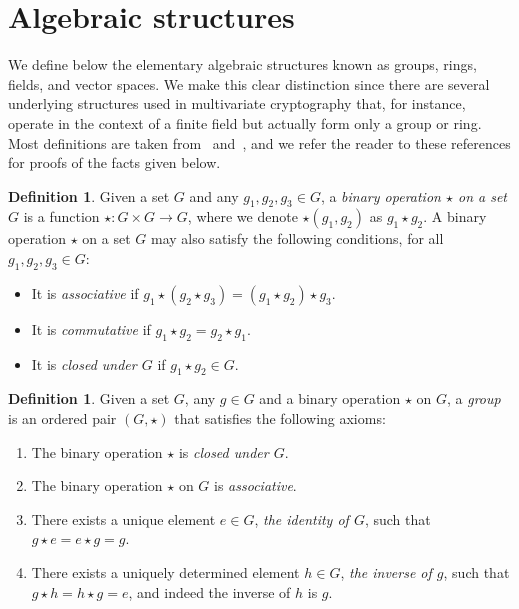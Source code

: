 \documentclass[12pt, a4paper, oneside]{memoir}
\theoremstyle{definition}
\newtheorem{definition}[theorem]{Definition}
\begin{document}
\section{Algebraic structures}\label{sec:algebra}

We define below the elementary algebraic structures known as groups, rings, fields, and vector spaces. We make this clear distinction since there are several underlying structures used in multivariate cryptography that, for instance, operate in the context of a finite field but actually form only a group or ring. Most definitions are taken from~\cite{Dummit:2003} and~\cite{Mullen:2013}, and we refer the reader to these references for proofs of the facts given below.

\begin{definition}
  Given a set $G$ and any $g_{1}, g_{2}, g_{3} \in G$, a \emph{binary operation $\star$ on a set $G$} is a function $\star : G \times G \to G$, where we denote $\star(g_{1}, g_{2})$ as $g_{1} \star g_{2}$. A binary operation $\star$ on a set $G$ may also satisfy the following conditions, for all $g_{1}, g_{2}, g_{3} \in G$:
  
  \begin{itemize}
    \item It is \emph{associative} if $g_{1} \star (g_{2} \star g_{3}) = (g_{1} \star g_{2}) \star g_{3}$.
    \item It is \emph{commutative} if $g_{1} \star g_{2} = g_{2} \star g_{1}$.
    \item It is \emph{closed under $G$} if $g_{1} \star g_{2} \in G$.
  \end{itemize}
\end{definition}

\begin{definition}
  Given a set $G$, any $g \in G$ and a binary operation $\star$ on $G$, a \emph{group} is an ordered pair $(G, \star)$ that satisfies the following axioms:
  
  \begin{enumerate}
    \item The binary operation $\star$ is \emph{closed under $G$}.
    \item The binary operation $\star$ on $G$ is \emph{associative}.
    \item There exists a unique element $e \in G$, \emph{the identity of $G$}, such that $g \star e = e \star g = g$.
    \item There exists a uniquely determined element $h \in G$, \emph{the inverse of $g$}, such that $g \star h = h \star g = e$, and indeed the inverse of $h$ is $g$.
  \end{enumerate}
\end{definition}
\end{document}
